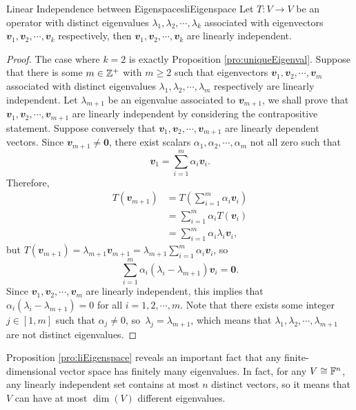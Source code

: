 \documentclass[math]{amznotes}
\theoremstyle{remark}
\newcommand{\zero}{\mathbf{0}}
\begin{document}
\begin{probox}{Linear Independence between Eigenspaces}{liEigenspace}
    Let $T \colon V \to V$ be an operator with distinct eigenvalues $\lambda_1, \lambda_2, \cdots, \lambda_k$ associated with eigenvectors $\mathbfit{v}_1, \mathbfit{v}_2, \cdots, \mathbfit{v}_k$ respectively, then $\mathbfit{v}_1, \mathbfit{v}_2, \cdots, \mathbfit{v}_k$ are linearly independent.
    \tcblower
    \begin{proof}
        The case where $k = 2$ is exactly Proposition \ref{pro:uniqueEigenval}. Suppose that there is some $m \in \mathbb{Z}^+$ with $m \geq 2$ such that eigenvectors $\mathbfit{v}_1, \mathbfit{v}_2, \cdots, \mathbfit{v}_m$ associated with distinct eigenvalues $\lambda_1, \lambda_2, \cdots, \lambda_m$ respectively are linearly independent. Let $\lambda_{m + 1}$ be an eigenvalue associated to $\mathbfit{v}_{m + 1}$, we shall prove that $\mathbfit{v}_1, \mathbfit{v}_2, \cdots, \mathbfit{v}_{m + 1}$ are linearly independent by considering the contrapositive statement. Suppose conversely that $\mathbfit{v}_1, \mathbfit{v}_2, \cdots, \mathbfit{v}_{m + 1}$ are linearly dependent vectors. Since $\mathbfit{v}_{m + 1} \neq \zero$, there exist scalars $\alpha_1, \alpha_2, \cdots, \alpha_m$ not all zero such that 
        \begin{equation*}
            \mathbfit{v}_1 = \sum_{i = 1}^{m}\alpha_i\mathbfit{v}_i.
        \end{equation*}
        Therefore, 
        \begin{align*}
            T(\mathbfit{v}_{m + 1}) & = T\left(\sum_{i = 1}^{m}\alpha_i\mathbfit{v}_i\right) \\
            & = \sum_{i = 1}^{m}\alpha_iT(\mathbfit{v}_i) \\
            & = \sum_{i = 1}^{m}\alpha_i\lambda_i\mathbfit{v}_i,
        \end{align*}
        but $T(\mathbfit{v}_{m + 1}) = \lambda_{m + 1}\mathbfit{v}_{m + 1} = \lambda_{m + 1}\sum_{i = 1}^{m}\alpha_i\mathbfit{v}_i$, so
        \begin{equation*}
            \sum_{i = 1}^m\alpha_i(\lambda_i - \lambda_{m + 1})\mathbfit{v}_i = \zero.
        \end{equation*}
        Since $\mathbfit{v}_1, \mathbfit{v}_2, \cdots, \mathbfit{v}_{m}$ are linearly independent, this implies that $\alpha_i(\lambda_i - \lambda_{m + 1}) = 0$ for all $i = 1, 2, \cdots, m$. Note that there exists some integer $j \in [1, m]$ such that $\alpha_j \neq 0$, so~$\lambda_j = \lambda_{m + 1}$, which means that $\lambda_1, \lambda_2, \cdots, \lambda_{m + 1}$ are not distinct eigenvalues.
    \end{proof}
\end{probox}
Proposition \ref{pro:liEigenspace} reveals an important fact that any finite-dimensional vector space has finitely many eigenvalues. In fact, for any $V \cong \mathbb{F}^n$, any linearly independent set contains at most $n$ distinct vectors, so it means that $V$ can have at most $\dim(V)$ different eigenvalues.
\end{document}
